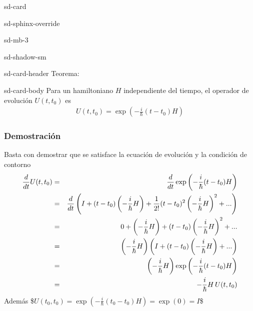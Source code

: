 \documentclass[letterpaper,10pt,english]{jupyterBook}
\begin{document}
\begin{sphinxuseclass}{sd-card}
\begin{sphinxuseclass}{sd-sphinx-override}
\begin{sphinxuseclass}{sd-mb-3}
\begin{sphinxuseclass}{sd-shadow-sm}
\begin{sphinxuseclass}{sd-card-header}
\sphinxAtStartPar
Teorema:

\end{sphinxuseclass}
\begin{sphinxuseclass}{sd-card-body}
\sphinxAtStartPar
Para un hamiltoniano \(H\) independiente del tiempo, el operador de evolución \(U(t,t_0)\) es
\begin{equation*}
\begin{split}
U(t,t_0) = \exp\left({-\frac{i}{\hbar} (t-t_0)H}\right)
\end{split}
\end{equation*}\subsubsection*{Demostración}

\sphinxAtStartPar
Basta con demostrar que se satisface la ecuación de evolución y la condición de contorno
\label{equation:docs/Part_01_Formalismo/Chapter_02_01_Fundamentos_MC_myst:9d5d8bb5-f010-441c-a5e9-9254dd2cb06f}\begin{eqnarray}
\frac{d}{dt}U(t,t_0) &=& \frac{d}{dt} \exp\left({-\frac{i}{\hbar} (t-t_0)H}\right)
    \nonumber\\ \rule{0mm}{6mm}
   &=& \frac{d}{dt}\left( I +(t-t_0)\left(-\frac{i}{\hbar} H\right) + \frac{1}{2!} 
    (t-t_0)^2\left(-\frac{i}{\hbar} H\right)^2  + ...\right) \nonumber\\ \rule{0mm}{6mm}
    &=& 0 +  \left(-\frac{i}{\hbar} H\right) +  (t-t_0)\left(-\frac{i}{\hbar} H\right)^2  + ... \nonumber\\ \rule{0mm}{6mm}
&=&  \left(-\frac{i}{\hbar} H\right)\left( I + (t-t_0) \left(-\frac{i}{\hbar} H\right) + ...\right)
  \nonumber \\ \rule{0mm}{6mm} 
&=& \left(-\frac{i}{\hbar} H\right) \exp\left({-\frac{i}{\hbar} (t-t_0)H}\right)    \nonumber\\ \rule{0mm}{6mm}
&=& -\frac{i}{\hbar} H \,  U(t,t_0)
\end{eqnarray}
\sphinxAtStartPar
Además
\$\(
U(t_0,t_0) =  \exp\left({-\frac{i}{\hbar} (t_0-t_0)H}\right)=\exp(0) = I
\)\$

\end{sphinxuseclass}
\end{sphinxuseclass}
\end{sphinxuseclass}
\end{sphinxuseclass}
\end{sphinxuseclass}
\end{document}
